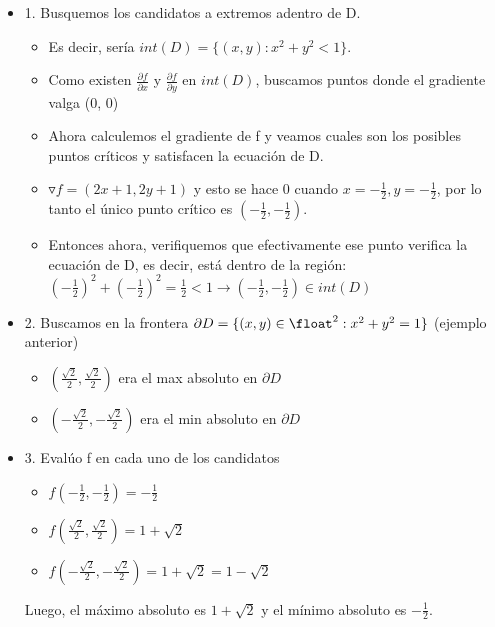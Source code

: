 \documentclass[10pt,a4paper]{article}
\begin{document}
\begin{itemize}
    \item 1. Busquemos los candidatos a extremos adentro de D. 
    \begin{itemize}
        \item Es decir, sería $int(D) = \{(x,y): x^{2} + y^{2} < 1\}$.
        \item Como existen $\frac{\partial f}{\partial x}$ y $\frac{\partial f}{\partial y}$ en $int(D)$, buscamos puntos donde el gradiente valga (0, 0)
        \item Ahora calculemos el gradiente de f y veamos cuales son los posibles puntos críticos y satisfacen la ecuación de D.
        \item $\triangledown f = (2x + 1, 2y + 1)$ y esto se hace 0 cuando $x = -\frac{1}{2}, y = -\frac{1}{2}$, por lo tanto el único punto crítico es $(-\frac{1}{2}, -\frac{1}{2})$.
        \item Entonces ahora, verifiquemos que efectivamente ese punto verifica la ecuación de D, es decir, está dentro de la región: $(-\frac{1}{2})^{2} + (-\frac{1}{2})^{2} = \frac{1}{2} < 1 \rightarrow (-\frac{1}{2}, -\frac{1}{2}) \in int(D)$
    
    \end{itemize}
    \item 2. Buscamos en la frontera $\partial D = \{(x,y) \in \float^{2}: x^{2} + y^{2} = 1\}$ (ejemplo anterior)
    \begin{itemize}
        \item $(\frac{\sqrt{2}}{2}, \frac{\sqrt{2}}{2})$ era el max absoluto en $\partial D$
        \item $(-\frac{\sqrt{2}}{2}, -\frac{\sqrt{2}}{2})$ era el min absoluto en $\partial D$
    \end{itemize}
    \item 3. Evalúo f en cada uno de los candidatos 
    \begin{itemize}
        \item $f(-\frac{1}{2}, -\frac{1}{2}) = -\frac{1}{2}$ 
        \item $f(\frac{\sqrt{2}}{2}, \frac{\sqrt{2}}{2}) = 1 + \sqrt{2}$ 
        \item $f(-\frac{\sqrt{2}}{2}, -\frac{\sqrt{2}}{2}) = 1 + \sqrt{2} = 1 - \sqrt{2}$ 
    \end{itemize}
    Luego, el máximo absoluto es $1 + \sqrt{2}$ y el mínimo absoluto es $-\frac{1}{2}$.
\end{itemize}
\end{document}
